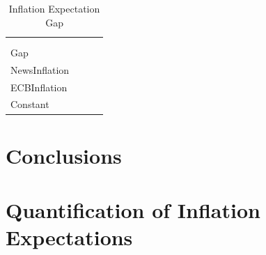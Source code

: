 \documentclass[review]{elsarticle}
\begin{document}
\begin{table}
\centering 
  \caption{Inflation Expectation Gap} 
  \label{tab:Inflation Expectation Gap}
\begin{tabular}{lccc}   
\\[-1.8ex]\hline
\hline \\[-1.8ex] 
& & &  \\ 
Gap & & & \\
NewsInflation & & & \\
ECBInflation & & & \\

Constant & & & \\
 \end{tabular} 
\end{table}

\section{Conclusions} \label{sec:Conclusions}




\newpage

\appendix

\section{Quantification of Inflation Expectations}\label{sec:Quantification of Inflation Expectations}
\end{document}
